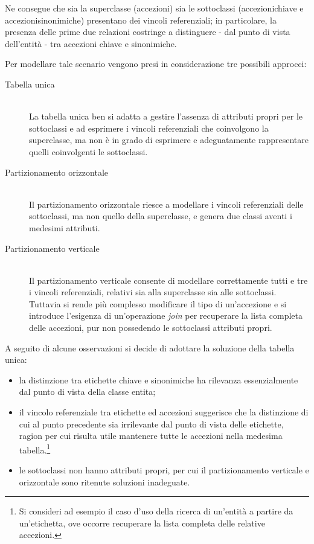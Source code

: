 Ne consegue che sia la superclasse (\textsf{accezioni}) sia le sottoclassi \linebreak(\textsf{accezioni\textunderscore chiave} e \textsf{accezioni\textunderscore sinonimiche}) presentano dei vincoli referenziali; in particolare, la presenza delle prime due relazioni costringe a distinguere - dal punto di vista dell'entità - tra accezioni chiave e sinonimiche.

Per modellare tale scenario vengono presi in considerazione tre possibili approcci:
\begin{description}
\item[Tabella unica] \hfill \\
La tabella unica ben si adatta a gestire l'assenza di attributi propri per le sottoclassi e ad esprimere i vincoli referenziali che coinvolgono la superclasse, ma non è in grado di esprimere e adeguatamente rappresentare quelli coinvolgenti le sottoclassi.
\item[Partizionamento orizzontale] \hfill \\
Il partizionamento orizzontale riesce a modellare i vincoli referenziali delle sottoclassi, ma non quello della superclasse, e genera due classi aventi i medesimi attributi.
\item[Partizionamento verticale] \hfill \\
Il partizionamento verticale consente di modellare correttamente tutti e tre i vincoli referenziali, relativi sia alla superclasse sia alle sottoclassi. Tuttavia si rende più complesso modificare il tipo di un'accezione e si introduce l'esigenza di un'operazione \textit{join} per recuperare la lista completa delle accezioni, pur non possedendo le sottoclassi attributi propri.
\end{description}

\pagebreak
A seguito di alcune osservazioni si decide di adottare la soluzione della tabella unica:
\begin{itemize}
\item la distinzione tra etichette chiave e sinonimiche ha rilevanza essenzialmente dal punto di vista della classe \textsf{entita};
\item il vincolo referenziale tra \textsf{etichette} ed \textsf{accezioni} suggerisce che la distinzione di cui al punto precedente sia irrilevante dal punto di vista delle etichette, ragion per cui risulta utile mantenere tutte le accezioni nella medesima tabella.\footnote{Si consideri ad esempio il caso d'uso della ricerca di un'entità a partire da un'etichetta, ove occorre recuperare la lista completa delle relative accezioni.}
\item le sottoclassi non hanno attributi propri, per cui il partizionamento verticale e orizzontale sono ritenute soluzioni inadeguate.
\end{itemize}

